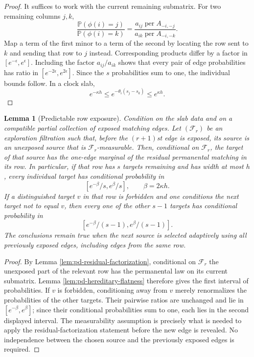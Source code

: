 \documentclass[11pt]{article}
\newtheorem{lemma}[theorem]{Lemma}
\theoremstyle{remark}
\newcommand{\Pp}{\mathbb P}
\begin{document}
\begin{proof}
It suffices to work with the current remaining submatrix.  For two remaining
columns $j,k$,
\[
 \frac{\Pp(\phi(i)=j)}{\Pp(\phi(i)=k)}
 =\frac{a_{ij}\operatorname{per}A_{-i,-j}}
 {a_{ik}\operatorname{per}A_{-i,-k}}.
\]
Map a term of the first minor to a term of the second by locating the row sent
to $k$ and sending that row to $j$ instead.  Corresponding products differ by
a factor in $[e^{-\epsilon},e^\epsilon]$.  Including the factor
$a_{ij}/a_{ik}$ shows that every pair of edge probabilities has ratio in
$[e^{-2\epsilon},e^{2\epsilon}]$.  Since the $s$ probabilities sum to one,
the individual bounds follow.  In a clock slab,
\[
        e^{-\kappa h}\le
        e^{-\theta_i(s_j-s_k)}\le e^{\kappa h}.
\]
\end{proof}
\begin{lemma}[Predictable row exposure]
\label{lem:pd-predictable-exposure}
Condition on the slab data and on a compatible partial collection of exposed
matching edges.  Let $(\mathscr F_r)$ be an exploration filtration such that,
before the $(r+1)$st edge is exposed, its source is an unexposed source that is
$\mathscr F_r$-measurable.  Then, conditional on $\mathscr F_r$, the target of
that source has the one-edge marginal of the residual permanental matching in
its row.  In particular, if that row has $s$ targets remaining and has width at
most $h$, every individual target has conditional probability in
\[
        [e^{-\beta}/s,e^\beta/s],
        \qquad \beta=2\kappa h.
\]
If a distinguished target $v$ in that row is forbidden and one conditions the
next target not to equal $v$, then every one of the other $s-1$ targets has
conditional probability in
\[
        [e^{-\beta}/(s-1),e^\beta/(s-1)].
\]
The conclusions remain true when the next source is selected adaptively using
all previously exposed edges, including edges from the same row.
\end{lemma}

\begin{proof}
By Lemma \ref{lem:pd-residual-factorization}, conditional on
$\mathscr F_r$ the unexposed part of the relevant row has the permanental law
on its current submatrix.  Lemma \ref{lem:pd-hereditary-flatness} therefore
gives the first interval of probabilities.  If $v$ is forbidden, conditioning
away from $v$ merely renormalizes the probabilities of the other targets.
Their pairwise ratios are unchanged and lie in $[e^{-\beta},e^\beta]$; since
their conditional probabilities sum to one, each lies in the second displayed
interval.  The measurability assumption is precisely what is needed to apply
the residual-factorization statement before the new edge is revealed.  No
independence between the chosen source and the previously exposed edges is
required.
\end{proof}
\end{document}
